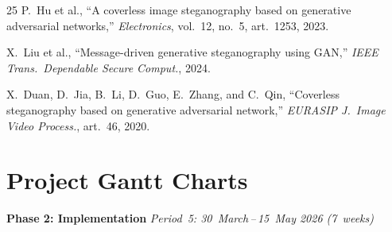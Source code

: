 \documentclass[10pt,twocolumn,a4paper]{article}
\begin{document}
\begin{thebibliography}{25}
P.~Hu et al.,
``A coverless image steganography based on generative adversarial networks,''
\textit{Electronics}, vol.~12, no.~5, art.~1253, 2023.

X.~Liu et al.,
``Message-driven generative steganography using GAN,''
\textit{IEEE Trans.\ Dependable Secure Comput.}, 2024.

X.~Duan, D.~Jia, B.~Li, D.~Guo, E.~Zhang, and C.~Qin,
``Coverless steganography based on generative adversarial network,''
\textit{EURASIP J.\ Image Video Process.}, art.~46, 2020.

\end{thebibliography}

\clearpage
\onecolumn
\appendix

\section{Project Gantt Charts}
\label{app:gantt}


\noindent\textbf{\large Phase 2: Implementation} \hfill
\textit{Period~5: 30~March\,--\,15~May 2026 (7~weeks)}

\vspace{6pt}
\end{document}
